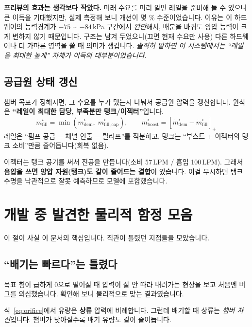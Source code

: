 \documentclass[11pt]{article}
\newcommand{\mdot}{\dot{m}}
\begin{document}
\begin{pitfall}
\textbf{프리뷰의 효과는 생각보다 작았다.} 미래 수요를 미리 알면 레일을 준비해 둘 수
있으니 큰 이득을 기대했지만, 실제 측정해 보니 개선이 몇 \% 수준이었습니다. 이유는
이 하드웨어의 능력경계가 $-75\sim-84$\,kPa 구간에서 \emph{완만}해서, 배분을 바꿔도
양압 능력이 크게 변하지 않기 때문입니다. 구조는 남겨 두었으니(끄면 현재 수요만 사용)
다른 하드웨어나 더 가파른 영역을 쓸 때 의미가 생깁니다. \emph{솔직히 말하면 이
시스템에서는 ``레일을 최대한 높게'' 자체가 이득의 대부분이었습니다.}
\end{pitfall}

\subsection{공급원 상태 갱신}

챔버 목표가 정해지면, 그 수요를 누가 댔는지 나눠서 공급원 압력을 갱신합니다.
원칙은 \textbf{``레일이 최대한 담당, 부족분만 탱크/이젝터''}입니다.
\[
\mdot^i_{\mathrm{fill}}=\min(\mdot^i_{\mathrm{dem}},\;\mdot^i_{\mathrm{fill,cap}}),\qquad
\mdot^i_{\mathrm{boost}}=[\mdot^i_{\mathrm{dem}}-\mdot^i_{\mathrm{fill}}]_+
\]
레일은 ``펌프 공급 $-$ 채널 인출 $-$ 릴리프''를 적분하고, 탱크는 ``부스트 $+$
이젝터의 탱크 소비''만큼 줄어듭니다(회복 없음).

\begin{keybox}
이젝터는 탱크 공기를 써서 진공을 만듭니다(소비 57\,LPM / 흡입 100\,LPM). 그래서
\textbf{음압을 쓰면 양압 자원(탱크)도 같이 줄어드는 결합}이 있습니다. 이걸 무시하면
탱크 수명을 낙관적으로 잘못 예측하므로 모델에 포함했습니다.
\end{keybox}

\section{개발 중 발견한 물리적 함정 모음}

이 절이 사실 이 문서의 핵심입니다. 직관이 틀렸던 지점들을 모았습니다.

\subsection{``배기는 빠르다''는 틀렸다}

목표 힘이 급하게 0으로 떨어질 때 압력이 잘 안 따라 내려가는 현상을 보고 처음엔
버그를 의심했습니다. 확인해 보니 물리적으로 맞는 결과였습니다.

식~\eqref{eq:orifice}에서 유량은 \textbf{상류} 압력에 비례합니다. 그런데 배기할 때
상류는 \emph{챔버 자신}입니다. 챔버가 낮아질수록 배기 유량도 같이 줄어듭니다.
\end{document}
